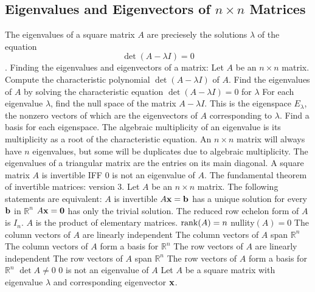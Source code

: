 \documentclass{article}
\begin{document}
        \subsection{Eigenvalues and Eigenvectors of $n\times n$ Matrices}
        \begin{outline}
            \1 The eigenvalues of a square matrix $A$ are preciesely the solutions \(\lambda\) of the equation \[\det (A-\lambda I) = 0\]. 
            \1 Finding the eigenvalues and eigenvectors of a matrix: Let $A$ be an \(n\times n\) matrix. 
                \2 Compute the characteristic polynomial \(\det (A-\lambda I)\) of $A$. 
                \2 Find the eigenvalues of $A$ by solving the characteristic equation \(\det (A-\lambda I)=0\) for \(\lambda\)
                \2 For each eigenvalue \(\lambda\), find the null space of the matrix \(A-\lambda I\). This is the eigenspace \(E_\lambda\), the nonzero vectors of which are the eigenvectors of $A$ corresponding to \(\lambda\). 
                \2 Find a basis for each eigenspace. 
            \1 The algebraic multiplicity of an eigenvalue is its multiplicity as a root of the characteristic equation. An \(n\times n\) matrix will always have $n$ eigenvalues, but some will be duplicates due to algebraic multiplicity. 
            \1 The eigenvalues of a triangular matrix are the entries on its main diagonal. 
            \1 A square matrix $A$ is invertible IFF $0$ is not an eigenvalue of $A$. 
            \1 The fundamental theorem of invertible matrices: version 3. Let $A$ be an $n\times n$ matrix. The following statements are equivalent: 
                \2 $A$ is invertible
                \2 $A\vb x=\vb b$ has a unique solution for every \(\vb b\) in \(\mathbb R^n\)
                \2 \(A\vb x=\vb 0\) has only the trivial solution. 
                \2 The reduced row echelon form of $A$ is \(I_n\). 
                \2 $A$ is the product of elementary matrices. 
                \2 \(\rank (A)=n\)
                \2 nullity\((A)=0\)
                \2 The column vectors of $A$ are linearly independent
                \2 The column vectors of $A$ span \(\mathbb R^n\)
                \2 The column vectors of $A$ form a basis for \(\mathbb R^n\)
                \2 The row vectors of $A$ are linearly independent
                \2 The row vectors of $A$ span \(\mathbb R^n\)
                \2 The row vectors of $A$ form a basis for \(\mathbb R^n\)
                \2 \(\det A\neq 0\)
                \2 $0$ is not an eigenvalue of $A$
            \1 Let $A$ be a square matrix with eigenvalue \(\lambda\) and corresponding eigenvector \(\vb x\). 

\end{outline}
\end{document}
